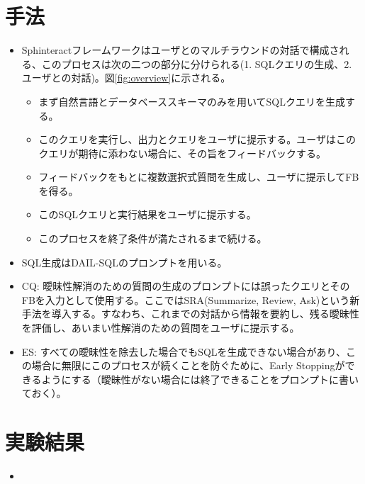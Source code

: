 \documentclass[dvipdfmx,uplatex]{jsarticle}
\theoremstyle{remark}
\newenvironment{method}[1]{
    \begin{tcolorbox}[
        colframe=green!50!black,
        colback=green!50!black!10!white,
        colbacktitle=green!50!black!40!white,
        coltitle=black,
        fonttitle=\bfseries,
        title={#1}
    ]
}{
    \end{tcolorbox}
}
\newenvironment{experiment}[1]{
    \begin{tcolorbox}[
        colframe=violet,
        colback=violet!10!white,
        colbacktitle=violet!40!white,
        coltitle=black,
        fonttitle=\bfseries,
        title={#1}
    ]
}{
    \end{tcolorbox}
}
\begin{document}
\section{手法}
\begin{method}{Sphinteract}
\begin{itemize}
    \item Sphinteractフレームワークはユーザとのマルチラウンドの対話で構成される、このプロセスは次の二つの部分に分けられる(1. SQLクエリの生成、2. ユーザとの対話)。図\ref{fig:overview}に示される。
    \begin{itemize}
        \item まず自然言語とデータベーススキーマのみを用いてSQLクエリを生成する。
        \item このクエリを実行し、出力とクエリをユーザに提示する。ユーザはこのクエリが期待に添わない場合に、その旨をフィードバックする。
        \item フィードバックをもとに複数選択式質問を生成し、ユーザに提示してFBを得る。
        \item このSQLクエリと実行結果をユーザに提示する。
        \item このプロセスを終了条件が満たされるまで続ける。
    \end{itemize}
    \item SQL生成はDAIL-SQLのプロンプトを用いる。
    \item CQ: 曖昧性解消のための質問の生成のプロンプトには誤ったクエリとそのFBを入力として使用する。ここではSRA(Summarize, Review, Ask)という新手法を導入する。すなわち、これまでの対話から情報を要約し、残る曖昧性を評価し、あいまい性解消のための質問をユーザに提示する。
    \item ES: すべての曖昧性を除去した場合でもSQLを生成できない場合があり、この場合に無限にこのプロセスが続くことを防ぐために、Early Stoppingができるようにする（曖昧性がない場合には終了できることをプロンプトに書いておく）。
\end{itemize}
\end{method}


\section{実験結果}
\begin{experiment}{実験手法}
\begin{itemize}
    \item 
\end{itemize}
\end{experiment}
\end{document}
